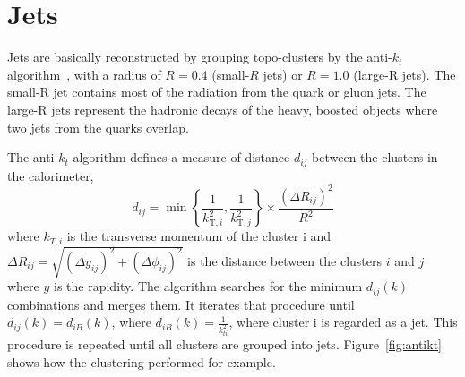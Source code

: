 \section{Jets}
Jets are basically reconstructed by grouping topo-clusters by the anti-$k_t$ algorithm~\cite{Cacciari_2008}, with a radius of $R = 0.4$ (small-$R$ jets) or $R = 1.0$ (large-R jets). 
The small-R jet contains most of the radiation from the quark or gluon jets. 
The large-R jets represent the hadronic decays of the heavy, boosted objects where two jets from the quarks overlap.

The anti-$k_t$ algorithm defines a measure of distance $d_{ij}$ between the clusters in the calorimeter,
\begin{equation}
d_{i j}=\min \left\{\frac{1}{k_{\mathrm{T}, i}^{2}}, \frac{1}{k_{\mathrm{T}, j}^{2}}\right\} \times \frac{\left(\Delta R_{i j}\right)^{2}}{R^{2}}
\end{equation}
where $k_{T,i}$ is the transverse momentum of the cluster i and $\Delta R_{i j}=\sqrt{\left(\Delta y_{i j}\right)^{2}+\left(\Delta \phi_{i j}\right)^{2}}$ is the distance between the clusters $i$ and $j$ where $y$ is the rapidity. 
The algorithm searches for the minimum $d_{i j}(k)$ combinations and merges them. 
It iterates that procedure until $d_{i j}(k) = d_{i B}(k)$, where $d_{i B}(k) = \frac{1}{k^2_{ti}}$, where cluster i is regarded as a jet.
This procedure is repeated until all clusters are grouped into jets.
Figure~\ref{fig:antikt} shows how the clustering performed for example.
